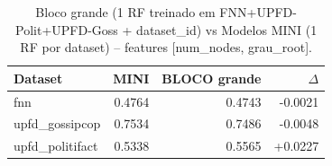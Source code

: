 \begin{table}[H]\centering
\caption{Bloco grande (1 RF treinado em FNN+UPFD-Polit+UPFD-Goss + dataset\_id) vs Modelos MINI (1 RF por dataset) -- features [num\_nodes, grau\_root].}
\label{tab:bloco_vs_mini}
\begin{tabular}{lrrr}
\toprule
Dataset & MINI & BLOCO grande & $\Delta$ \\
\midrule
fnn & 0.4764 & 0.4743 & -0.0021 \\
upfd\_gossipcop & 0.7534 & 0.7486 & -0.0048 \\
upfd\_politifact & 0.5338 & 0.5565 & +0.0227 \\
\bottomrule
\end{tabular}
\end{table}